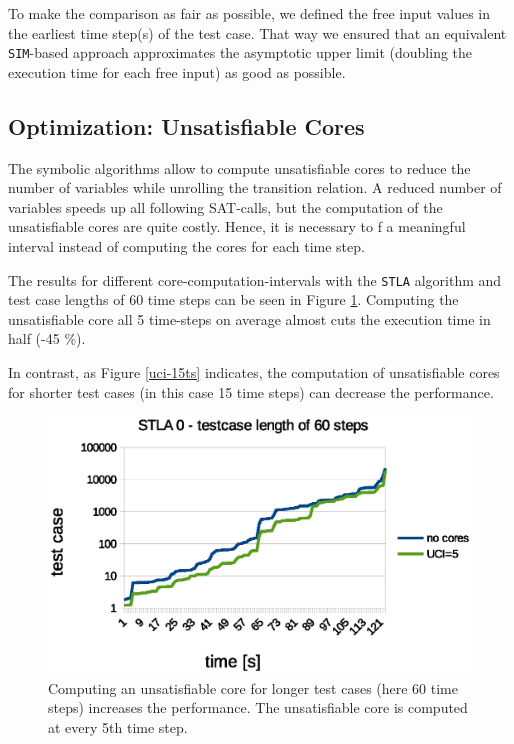 \documentclass[a4paper,10pt]{article}
\begin{document}
To make the comparison as fair as possible, we defined the free input values in the earliest time step(s) of the test case. 
That way we ensured that an equivalent \texttt{SIM}-based approach approximates the asymptotic upper limit (doubling the execution time for each free input) as good as possible. 



\subsection{Optimization: Unsatisfiable Cores}
The symbolic algorithms allow to compute unsatisfiable cores to reduce the number of variables while unrolling the transition relation. A reduced number of variables speeds up all following SAT-calls,
but the computation of the unsatisfiable cores are quite costly. Hence, it is necessary to f a meaningful interval instead of computing the cores for each time step.

The results for different core-computation-intervals with the \texttt{STLA} algorithm and test case lengths of 60 time steps can be seen in Figure \ref{uci-30ts}. Computing the unsatisfiable core all 5 time-steps on average almost cuts
the execution time in half (-45 \%).

In contrast, as Figure \ref{uci-15ts} indicates, the computation of unsatisfiable cores for shorter test cases (in this case 15 time steps) can decrease the performance.

\begin{figure}[!htb]
\centering
\includegraphics[scale = 0.64]{img/uci-60ts.eps}
\centering \caption{Computing an unsatisfiable core for longer test cases (here 60 time steps) increases the performance. The unsatisfiable core is computed at every 5th time step.} 
\label{uci-30ts}
\end{figure}
\end{document}
